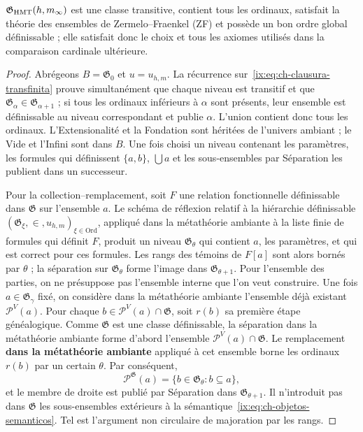 \begin{lemma}
\label{ix:thm:ch-6b}
\(\mathfrak G_{\rm HMT}(h,m_\infty)\) est une classe transitive, contient tous les ordinaux, satisfait la théorie des ensembles de Zermelo--Fraenkel (ZF) et possède un bon ordre global définissable ; elle satisfait donc le choix et tous les axiomes utilisés dans la comparaison cardinale ultérieure.

\end{lemma}
\begin{proof}
Abrégeons \(B=\mathfrak G_0\) et \(u=u_{h,m}\). La récurrence
sur~\eqref{ix:eq:ch-clausura-transfinita} prouve simultanément que chaque niveau est transitif et que
\(\mathfrak G_\alpha\in\mathfrak G_{\alpha+1}\) ; si tous les ordinaux
inférieurs à \(\alpha\) sont présents, leur ensemble est définissable au niveau
correspondant et publie \(\alpha\). L’union contient donc tous les
ordinaux. L’Extensionalité et la Fondation sont héritées de l’univers ambiant ;
le Vide et l’Infini sont dans \(B\). Une fois choisi un niveau contenant les paramètres,
les formules qui définissent \(\{a,b\}\), \(\bigcup a\) et les sous-ensembles par
Séparation les publient dans un successeur.

Pour la collection--remplacement, soit \(F\) une relation fonctionnelle définissable dans \(\mathfrak G\) sur l'ensemble \(a\). Le schéma de réflexion relatif à la hiérarchie définissable \((\mathfrak G_\xi,\in,u_{h,m})_{\xi\in\mathrm{Ord}}\), appliqué dans la métathéorie ambiante à la liste finie de formules qui définit \(F\), produit un niveau \(\mathfrak G_\theta\) qui contient \(a\), les paramètres, et qui est correct pour ces formules. Les rangs des témoins de \(F[a]\) sont alors bornés par \(\theta\) ; la séparation sur \(\mathfrak G_\theta\) forme l'image dans \(\mathfrak G_{\theta+1}\). Pour l'ensemble des parties, on ne présuppose pas l'ensemble interne que l'on veut construire. Une fois \(a\in\mathfrak G_\gamma\) fixé, on considère dans la métathéorie ambiante l'ensemble déjà existant \(\mathcal P^V(a)\). Pour chaque \(b\in\mathcal P^V(a)\cap\mathfrak G\), soit \(r(b)\) sa première étape généalogique. Comme \(\mathfrak G\) est une classe définissable, la séparation dans la métathéorie ambiante forme d'abord l'ensemble \(\mathcal P^V(a)\cap\mathfrak G\). Le remplacement \textbf{dans la métathéorie ambiante} appliqué à cet ensemble borne les ordinaux \(r(b)\) par un certain \(\theta\). Par conséquent,
\[
 \mathcal P^{\mathfrak G}(a)
 =\{b\in\mathfrak G_\theta:b\subseteq a\},
\]
et le membre de droite est publié par Séparation dans
\(\mathfrak G_{\theta+1}\). Il n’introduit pas dans \(\mathfrak G\) les sous-ensembles
extérieurs à la sémantique~\eqref{ix:eq:ch-objetos-semanticos}. Tel est l’argument non circulaire de
majoration par les rangs.


\end{proof}
